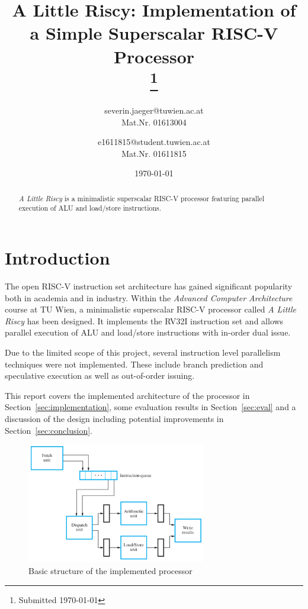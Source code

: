 \documentclass[conference]{IEEEtran}
\begin{document}
\title{A Little Riscy: Implementation of a Simple Superscalar RISC-V Processor\\
{
\thanks{Submitted \today}
}
}

\date{\today}

\author{
severin.jaeger@tuwien.ac.at\\
Mat.Nr. 01613004\\

\and
{}
e1611815@student.tuwien.ac.at\\
Mat.Nr. 01611815\\
}

\maketitle

\begin{abstract}
\emph{A Little Riscy} is a minimalistic superscalar RISC-V processor featuring parallel execution of ALU and load/store instructions.
\end{abstract}

\section{Introduction}
The open RISC-V instruction set architecture \cite{risc-v} has gained significant popularity both in academia and in industry. Within the \emph{Advanced Computer Architecture} course at TU Wien, a minimalistic superscalar RISC-V processor called \emph{A Little Riscy} has been designed. It implements the RV32I instruction set and allows parallel execution of ALU and load/store instructions with in-order dual issue.

Due to the limited scope of this project, several instruction level parallelism techniques were not implemented. These include branch prediction and speculative execution as well as out-of-order issuing.

This report covers the implemented architecture of the processor in Section~\ref{sec:implementation}, some evaluation results in Section~\ref{sec:eval} and a discussion of the design including potential improvements in Section~\ref{sec:conclusion}.

\begin{figure}[h]
	\centering
	\includegraphics[width=7.8cm]{basic_architecture.PNG}
	\caption{Basic structure of the implemented processor \cite{Hamacher}}
	\label{fig:basic_arch}
\end{figure}
\end{document}
